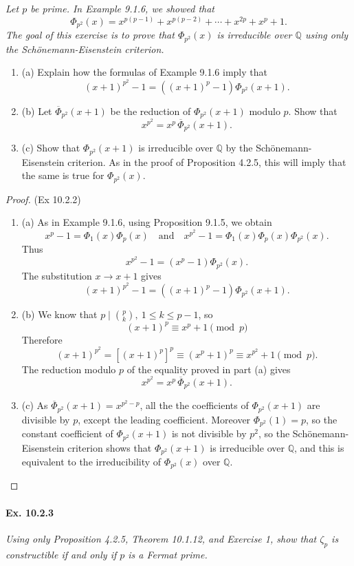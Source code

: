 \documentclass[11pt,a4paper]{article}
\newcommand{\be} {\begin{enumerate}}
\newcommand{\ee} {\end{enumerate}}
\newcommand{\Q}{\mathbb{Q}}
\begin{document}
{\it Let $p$ be prime. In Example 9.1.6, we showed that
$$\Phi_{p^2}(x) = x^{p(p-1)}+ x^{p(p-2)} + \cdots + x^{2p} +x^p + 1.$$
The goal of this exercise is to prove that $\Phi_{p^2}(x)$ is irreducible over $\Q$ using only the Sch\"onemann-Eisenstein criterion.
\be
\item[(a)] Explain how the formulas of Example 9.1.6 imply that
$$(x+1)^{p^2} - 1 = ((x+1)^p - 1)\Phi_{p^2}(x+1).$$
\item[(b)] Let $\overline{\Phi}_{p^2}(x+1)$ be the reduction of $\Phi_{p^2}(x+1)$ modulo $p$. Show that
$$x^{p^2} = x^p\, \overline{\Phi}_{p^2}(x+1).$$
\item[(c)] Show that $\Phi_{p^2}(x+1)$ is irreducible over $\Q$ by the Sch\"onemann-Eisenstein criterion. As in the proof of Proposition 4.2.5, this will imply that the same is true for $\Phi_{p^2}(x)$.
\ee
}

\begin{proof} (Ex 10.2.2)
\be
\item[(a)] As in Example 9.1.6, using Proposition 9.1.5, we obtain
$$x^p -1 = \Phi_1(x) \Phi_p(x) \quad \mathrm{and} \quad x^{p^2} - 1 = \Phi_1(x) \Phi_p(x) \Phi_{p^2}(x).$$
Thus
$$x^{p^2} - 1 = (x^p-1) \Phi_{p^2}(x).$$
The substitution $x \to x+1$ gives
$$(x+1)^{p^2} - 1 = ((x+1)^p - 1)\Phi_{p^2}(x+1).$$

\item[(b)]
We know that $p \mid \binom{p}{k}, \ 1 \leq k \leq p-1$, so
$$(x+1)^p  \equiv x^p + 1 \pmod p $$
Therefore
$$ (x+1)^{p^2} =[(x+1)^p]^p  \equiv  (x^p + 1)^p \equiv x^{p^2}+1 \pmod p.$$
The reduction modulo $p$ of the equality proved in part (a) gives
$$x^{p^2} = x^p\, \overline{\Phi}_{p^2}(x+1).$$

\item[(c)] As $ \overline{\Phi}_{p^2}(x+1) = x^{p^2-p}$, all the the coefficients of $\Phi_{p^2}(x+1)$ are divisible by $p$, except the leading coefficient. Moreover $\Phi_{p^2}(1) = p$, so the constant coefficient of $\Phi_{p^2}(x+1)$ is not divisible by $p^2$, so the Sch\"onemann-Eisenstein criterion shows that $\Phi_{p^2}(x+1)$ is irreducible over $\Q$, and this is equivalent to the irreducibility of $\Phi_{p^2}(x)$ over $\Q$.
\ee
\end{proof}

\paragraph{Ex. 10.2.3}

{\it Using only Proposition 4.2.5, Theorem 10.1.12, and Exercise 1, show that $\zeta_p$ is constructible if and only if $p$ is a Fermat prime.
}
\end{document}
